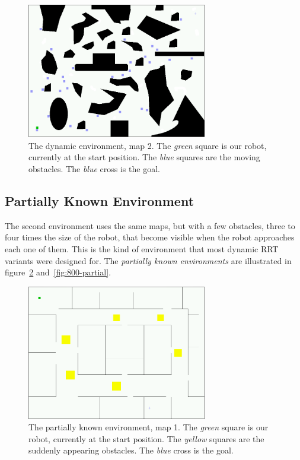 \begin{figure}[h!]
\begin{center}
\includegraphics[width=0.7\textwidth]{images/800-dynamic}
\caption[The dynamic environment, map 2]{The dynamic environment, map 2. The \emph{green} square is our robot,
currently at the start position. The
\emph{blue} squares are the moving obstacles. The \emph{blue} cross is the goal.}
\label{fig:800-dynamic}
\end{center}
\end{figure}

\subsection{Partially Known Environment}

The second environment uses the same maps, but with a few  obstacles, three to four
times the size of the robot, that become visible when the robot approaches each
one of them. This is the kind of environment that most dynamic RRT variants were designed
for. The
\emph{partially known environments} are illustrated in figure~\ref{fig:office-partial}
and~\ref{fig:800-partial}.

\begin{figure}[h!]
\begin{center}
\includegraphics[width=0.7\textwidth]{images/office-partial}
\caption[The partially known environment, map 1]{The partially known environment, map 1. The \emph{green} square is our robot,
currently at the start position. The \emph{yellow} squares are the suddenly
appearing obstacles. The \emph{blue} cross is the goal.}
\label{fig:office-partial}
\end{center}
\end{figure}

